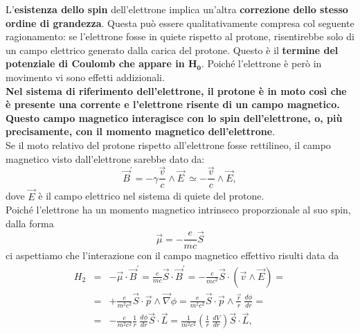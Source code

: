 \documentclass[a4paper,12pt,oneside]{book}
\begin{document}
L'\textbf{esistenza dello spin} dell'elettrone implica un'altra \textbf{correzione dello stesso ordine di grandezza}. Questa può essere qualitativamente compresa col seguente ragionamento: se l'elettrone fosse in quiete rispetto al protone, risentirebbe solo di un campo elettrico generato dalla carica del protone. Questo è il \textbf{termine del potenziale di Coulomb che appare in $\boldsymbol{H_0}$}. Poiché l'elettrone è però in movimento vi sono effetti addizionali. \\
\textbf{Nel sistema di riferimento dell'elettrone, il protone è in moto così che è presente una corrente e l'elettrone risente di un campo magnetico. Questo campo magnetico interagisce con lo spin dell'elettrone, o, più precisamente, con il momento magnetico dell'elettrone}. \\
Se il moto relativo del protone rispetto all'elettrone fosse rettilineo, il campo magnetico visto dall'elettrone sarebbe dato da:
\begin{equation} 
\vec{B}^{'}=-\gamma \frac{\vec{v}}{c} \wedge \vec{E} \ \simeq -\frac{\vec{v}}{c} \wedge \vec{E} ,
\end{equation}
dove $\vec{E}$ è il campo elettrico nel sistema di quiete del protone. \\
Poiché l'elettrone ha un momento magnetico intrinseco proporzionale al suo spin, dalla forma
\begin{equation} 
\vec{\mu}=-\frac{e}{mc}\vec{S} 
\end{equation}
ci aspettiamo che l'interazione con il campo magnetico effettivo risulti data da
\begin{eqnarray}
H_2 & =& -\vec{\mu} \cdot \vec{B}^{'}=\frac{e}{mc} \vec{S} \cdot \vec{B}^{'}= -\frac{e}{mc^2}\vec{S} \cdot \left( \vec{v} \wedge \vec{E} \right)= \nonumber \\
& =& + \frac{e}{m^2c^2}\vec{S} \cdot \vec{p} \wedge \vec{\nabla}\phi= \frac{e}{m^2c^2}\vec{S} \cdot \vec{p} \wedge \frac{\vec{r}}{r} \ \frac{d\phi}{dr}= \nonumber \\
& = &-\frac{e}{m^2c^2}\frac{1}{r} \ \frac{d\phi}{dr}\vec{S} \cdot \vec{L}= \frac{1}{m^2c^2} \left( \frac{1}{r} \ \frac{dV}{dr} \right) \vec{S} \cdot \vec{L} ,
\end{eqnarray}
\end{document}
